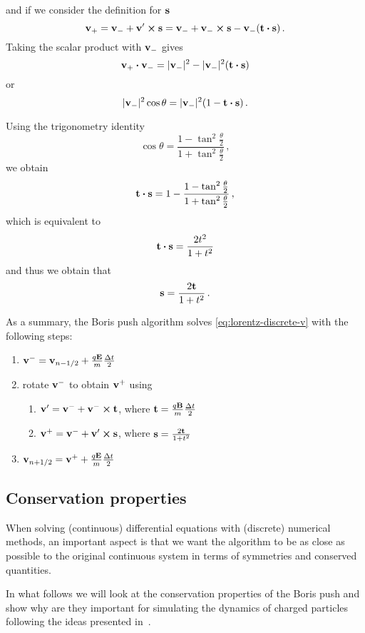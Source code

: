 \documentclass[12pt, class=report, crop=false]{standalone}
\begin{document}
and if we consider the definition for \(\vb{s}\)
\[
\vb{v}_+ = \vb{v}_- + \vb{v}' \cp \vb{s} =
\vb{v}_- + \vb{v}_- \cp \vb{s} - \vb{v}_- (\vb{t} \vdot \vb{s})\,.
\]
Taking the scalar product with \(\vb{v}_-\) gives
\[
\vb{v}_+ \vdot \vb{v}_- = |\vb{v}_-|^2 - |\vb{v}_-|^2 (\vb{t} \vdot \vb{s})
\]
or
\[
|\vb{v}_-|^2 \cos{\theta} = |\vb{v}_-|^2 (1 - \vb{t} \vdot \vb{s})\,.
\]

Using the trigonometry identity
\[
\cos{\theta} = \frac{1-\tan^2{\frac{\theta}{2}}}{1+\tan^2{\frac{\theta}{2}}}\,,
\]
we obtain
\[
\vb{t} \vdot \vb{s} = 1 - \frac{1-\tan^2{\frac{\theta}{2}}}{1+\tan^2{\frac{\theta}{2}}}\,,
\]
which is equivalent to
\[
\vb{t} \vdot \vb{s} = \frac{2 t^2}{1+t^2}
\]
and thus we obtain that
\[
\vb{s} = \frac{2 \vb{t}}{1+t^2}\,.
\]

As a summary, the Boris push algorithm solves \cref{eq:lorentz-discrete-v} with the following steps:
\begin{enumerate}
  \item \(\vb{v}^- = \vb{v}_{n-1/2} + \frac{q \vb{E}}{m} \frac{\Delta t}{2}\)
  \item rotate \(\vb{v}^-\) to obtain \(\vb{v}^+\) using
  \begin{enumerate}
    \item \(\vb{v}' = \vb{v}^- + \vb{v}^- \cp \vb{t}\), where \(\vb{t} = \frac{q \vb{B}}{m} \frac{\Delta t}{2}\)
    \item \(\vb{v}^+ = \vb{v}^- + \vb{v}' \cp \vb{s}\), where \(\vb{s} = \frac{2 \vb{t}}{1+t^2}\)
  \end{enumerate}
  \item \(\vb{v}_{n+1/2} = \vb{v}^+ + \frac{q \vb{E}}{m} \frac{\Delta t}{2}\)
\end{enumerate}

\subsection{Conservation properties}

When solving (continuous) differential equations with (discrete) numerical methods,
an important aspect is that we want the algorithm to be as close as possible to
the original continuous system in terms of symmetries and conserved quantities. %

In what follows we will look at the conservation properties of the Boris push
and show why are they important for simulating the dynamics of charged particles
following the ideas presented in~\textcite{qin_whyboris_2013}.
\end{document}
